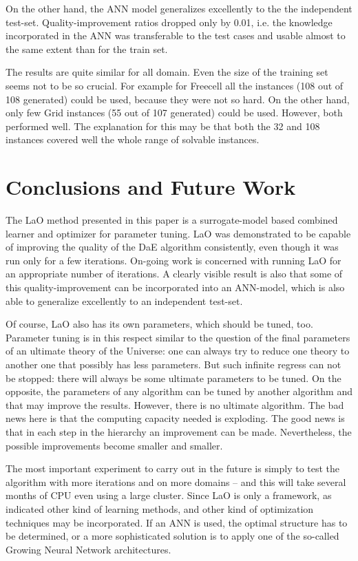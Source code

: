 \documentclass[runningheads,a4paper]{llncs}
\begin{document}
On the other hand, the ANN model generalizes excellently to the the independent test-set. Quality-improvement ratios dropped only by 0.01, i.e. the knowledge incorporated in the ANN was transferable to the test cases and usable almost to the same extent than for the train set.

The results are quite similar for all domain. Even the size of the training set seems not to be so crucial. For example for Freecell all the instances (108 out of 108 generated) could be used, because they were not so hard. On the other hand, only few  Grid instances (55 out of 107 generated) could be used. However, both performed well. The explanation for this may be that both the 32 and 108 instances covered well the whole range of solvable instances.

\section{Conclusions and Future Work}
\label{section:conclusions}
\label{section:futurework}	

The LaO method presented in this paper is a surrogate-model based combined learner and optimizer for parameter tuning. LaO was demonstrated to be capable of improving the quality of the DaE algorithm consistently, even though it was run only for a few iterations. On-going work is concerned with running LaO for an appropriate number of iterations. A clearly visible result is also that some of this quality-improvement can be incorporated into an ANN-model, which is also able to generalize excellently to an independent test-set.


Of course, LaO also has its own parameters, which should be tuned, too. Parameter tuning is in this respect similar to the question of the final parameters of an ultimate theory of the Universe: one can always try to reduce one theory to another one that possibly has less parameters. But such infinite regress can not be stopped: there will always be some ultimate parameters to be tuned. On the opposite, the parameters of any algorithm can be tuned by another algorithm and that may improve the results. However, there is no ultimate algorithm. The bad news here is that the computing capacity needed is exploding. The good news is that in each step in the hierarchy an improvement can be made. Nevertheless, the possible improvements become smaller and smaller.


The most important experiment to carry out in the future is simply to test the algorithm with more iterations and on more domains -- and this will take several months of CPU even using a large cluster. Since LaO is only a framework, as indicated other kind of learning methods, and other kind of optimization techniques may be incorporated. If an ANN is used, the optimal structure has to be determined, or a more sophisticated solution is to apply one of the so-called Growing Neural Network architectures.
\end{document}
